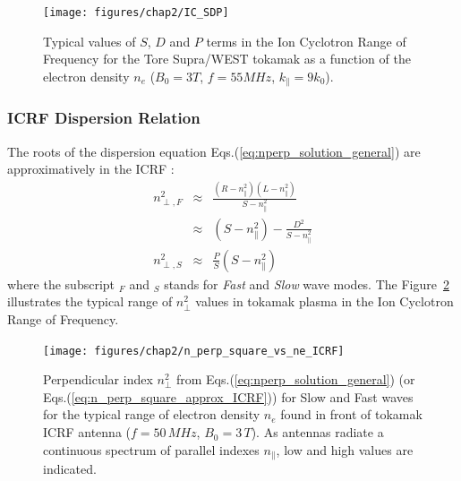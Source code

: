 \begin{figure}[h]
	\centering
	\texttt{[image: figures/chap2/IC\_SDP]}
	\caption{Typical values of $S$, $D$ and $P$ terms in the Ion Cyclotron Range of Frequency for the Tore Supra/WEST tokamak as a function of the electron density $n_e$ ($B_0=3\si{T}$, $f=55\si{MHz}$, $k_\parallel=9 k_0$).}
	\label{fig:icsdp}
\end{figure}



\subsubsection{ICRF Dispersion Relation}
The roots of the dispersion equation Eqs.(\ref{eq:nperp_solution_general}) are approximatively in the ICRF : 
\begin{subequations}
\begin{eqnarray}
n_{\perp, F}^2 &\approx& \frac{\left(R - n_\parallel^2 \right)\left(L - n_\parallel^2\right)}{S-n_\parallel^2} \\
			   &\approx& \left(S-n_\parallel^2 \right) - \frac{D^2}{S-n_\parallel^2} \nonumber \\
n_{\perp, S}^2 &\approx& \frac{P}{S}\left(S - n_\parallel^2 \right)
\label{eq:n_perp_square_approx_ICRF}		  
\end{eqnarray}
\end{subequations}
where the subscript $_F$ and $_S$ stands for \textit{Fast} and \textit{Slow} wave modes. The Figure~\ref{fig:nperpsquarevsne_ICRF} illustrates the typical range of $n_\perp^2$ values in tokamak plasma in the Ion Cyclotron Range of Frequency. 

\begin{figure}
	\centering
	\texttt{[image: figures/chap2/n\_perp\_square\_vs\_ne\_ICRF]}
	\caption{Perpendicular index $n_\perp^2$ from Eqs.(\ref{eq:nperp_solution_general}) (or Eqs.(\ref{eq:n_perp_square_approx_ICRF})) for Slow and Fast waves for the typical range of electron density $n_e$ found in front of tokamak ICRF antenna ($f=50\,\si{MHz}$, $B_0=3\,\si{T}$). As antennas radiate a continuous spectrum of parallel indexes $n_\parallel$, low and high values are indicated.}
	\label{fig:nperpsquarevsne_ICRF}
\end{figure}

